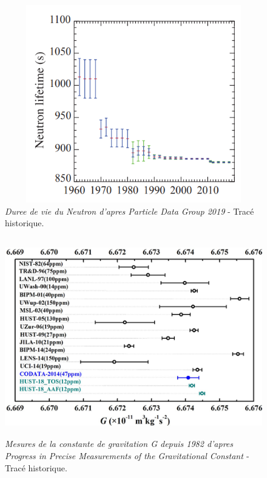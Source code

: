 \documentclass[a4paper,12pt]{article}
\begin{document}
\begin{appendix}
\begin{figure}
\centering
\includegraphics[width=13.5cm,height=8.6cm]{./figures/neutron-lifetime-pdg.png}
\caption[Mesures de la duree de vie du neutron depuis 1962]{\textit{Duree de vie du Neutron d'apres Particle Data Group 2019} - Tracé historique.} 
\label{fig:6:figure6}
\end{figure}


\begin{figure}
\centering
\includegraphics[width=14.5cm,height=8.6cm]{./figures/ProgressinPreciseMeasurementsoftheGravitationalConstant.png}
\caption[Mesures de la constante de gravitation G depuis 1982]{\textit{Mesures de la constante de gravitation G depuis 1982 d'apres Progress in Precise Measurements of the Gravitational Constant \cite{Wu}} - Tracé historique.} 
\label{fig:8:figure8}
\end{figure}


\end{appendix}
\end{document}
